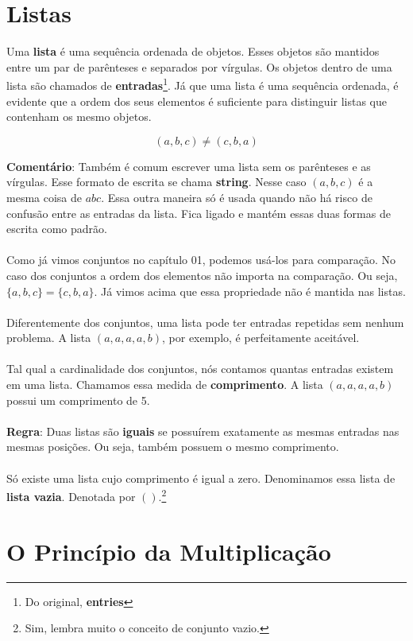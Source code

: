 \documentclass[a4paper,11pt,oneside]{book}
\theoremstyle{definition}
\theoremstyle{break}
\begin{document}
\section{Listas}

Uma \textbf{lista} é uma sequência ordenada de objetos. Esses objetos são mantidos entre um par de parênteses e separados por vírgulas. Os objetos dentro de uma lista são chamados de \textbf{entradas}\footnote{Do original, \textbf{entries}}. Já que uma lista é uma sequência ordenada, é evidente que a ordem dos seus elementos é suficiente para distinguir listas que contenham os mesmo objetos.

$$ (a,b,c) \neq (c,b,a) $$

\textbf{Comentário}: Também é comum escrever uma lista sem os parênteses e as vírgulas. Esse formato de escrita se chama \textbf{string}. Nesse caso $(a,b,c)$ é a mesma coisa de $abc$. Essa outra maneira só é usada quando não há risco de confusão entre as entradas da lista. Fica ligado e mantém essas duas formas de escrita como padrão.
\\
\\
Como já vimos conjuntos no capítulo 01, podemos usá-los para comparação. No caso dos conjuntos a ordem dos elementos não importa na comparação. Ou seja, $\{a,b,c\} = \{c,b,a\}$. Já vimos acima que essa propriedade não é mantida nas listas. 
\\
\\
Diferentemente dos conjuntos, uma lista pode ter entradas repetidas sem nenhum problema. A lista $(a,a,a,a,b)$, por exemplo, é perfeitamente aceitável.
\\
\\
Tal qual a cardinalidade dos conjuntos, nós contamos quantas entradas existem em uma lista. Chamamos essa medida de \textbf{comprimento}. A lista $(a,a,a,a,b)$ possui um comprimento de 5.
\\
\\
\textbf{Regra}: Duas listas são \textbf{iguais} se possuírem exatamente as mesmas entradas nas mesmas posições. Ou seja, também possuem o mesmo comprimento.
\\
\\
Só existe uma lista cujo comprimento é igual a zero. Denominamos essa lista de \textbf{lista vazia}. Denotada por $()$.\footnote{Sim, lembra muito o conceito de conjunto vazio.}

\section{O Princípio da Multiplicação}
\end{document}
